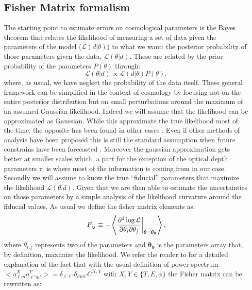 \documentclass[aps,prl,preprint,groupedaddress]{revtex4-1}
\begin{document}
\subsection{Fisher Matrix formalism}
The starting point to estimate errors on cosmological parameters is the Bayes theorem that relates the likelihood of measuring a set of data given the parameters of the model ($\mathcal{L}(d|\theta)$) to what we want: the posterior probability of those parameters given the data, $\mathcal{L}(\theta|d)$.
These are related by the prior probability of the parameters $P(\theta)$ through:
\begin{equation}
\mathcal{L}(\theta|d)\propto \mathcal{L}(d|\theta)P(\theta),
\end{equation}
where, as usual, we have neglect the probability of the data itself.
These general framework can be simplified in the context of cosmology by focusing not on the entire posterior distribution but on small perturbations around the maximum of an assumed Gaussian likelihood. 
Indeed we will assume that the likelihood can be approximated as Gaussian.
While this approximate the true likelihood most of the time, the opposite has been found in other cases \cite{2012JCAP...09..009W}. Even if other methods of analysis have been proposed \cite{2006JCAP...10..013P,2006astro.ph..9591A} this is still the standard assumption when future constrains have been forecasted \cite{wu:2014}. Moreover the gaussian approximation gets better at smaller scales which, a part for the exception of the optical depth parameters $\tau$, is where most of the information is coming from in our case.
Secondly we will assume to know the true ``fiducial'' parameters that maximize the likelihood $\mathcal{L}(\theta|d)$. Given that we are then able to estimate the uncertainties on those parameters by a simple analysis of the likelihood curvature around the fiducial values.
As usual we define the fisher matrix elements as:
\begin{equation}
	\centering
		F_{ij} \equiv - \left\langle\frac{\partial^2 \log \mathcal{L}}{\partial \theta_i \partial \theta_j} \bigg|_{\boldsymbol{\theta} = \boldsymbol{\theta_0}}\right\rangle,
	\label{eq:Fij_def}
\end{equation}
where $\theta_{i,j}$ represents two of the parameters and $\boldsymbol{\theta_0}$ is the parameters array that, by definition, maximize the likelihood.
We refer the reader to \cite{} for a detailed explanation of the fact that with the usual definition of power spectrum $<a_{\ell m}^{X}a_{\ell' m'}^{Y}>=\delta_{\ell \ell'}\delta_{mm'}C^{X,Y}$ with $X,Y\in\{T,E,\phi\}$ the Fisher matrix can be rewritten as:
\end{document}
